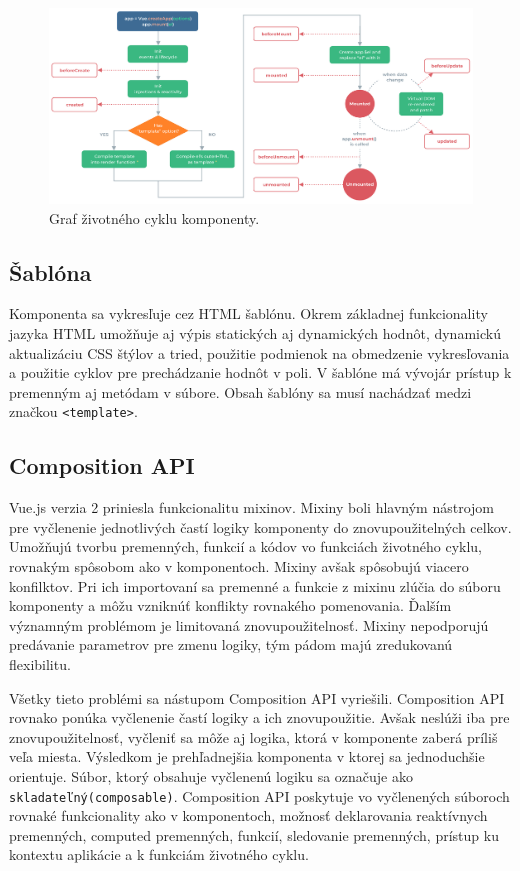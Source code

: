     \begin{figure}[!hbt]
        \centering
        \includegraphics[scale=0.3]{obrazky/lifecycle.png}
        \caption{Graf životného cyklu komponenty\cite{vue-guide}.}
        \label{pic:hooks}
    \end{figure}

\subsection*{Šablóna}
Komponenta sa vykresľuje cez HTML šablónu. Okrem základnej funkcionality jazyka HTML umožňuje aj výpis statických aj dynamických hodnôt, dynamickú aktualizáciu CSS štýlov a tried, použitie podmienok na obmedzenie vykresľovania a použitie cyklov pre prechádzanie hodnôt v poli. V šablóne má vývojár prístup k premenným aj metódam v súbore. Obsah šablóny sa musí nachádzať medzi značkou \texttt{<template>}.

\subsection{Composition API}
\label{compositionapi}
Vue.js verzia 2 priniesla funkcionalitu mixinov. Mixiny boli hlavným nástrojom pre vyčlenenie jednotlivých častí logiky komponenty do znovupoužitelných celkov. Umožňujú tvorbu premenných, funkcií a kódov vo funkciách životného cyklu, rovnakým spôsobom ako v komponentoch. Mixiny avšak spôsobujú viacero konfilktov. Pri ich importovaní sa premenné a funkcie z mixinu zlúčia do súboru komponenty a môžu vzniknúť konflikty rovnakého pomenovania. Ďalším významným problémom je limitovaná znovupoužitelnosť. Mixiny nepodporujú predávanie parametrov pre zmenu logiky, tým pádom majú zredukovanú flexibilitu.

Všetky tieto problémi sa nástupom Composition API vyriešili. Composition API rovnako ponúka vyčlenenie častí logiky a ich znovupoužitie. Avšak neslúži iba pre znovupoužitelnosť, vyčleniť sa môže aj logika, ktorá v komponente zaberá príliš veľa miesta.  Výsledkom je prehľadnejšia komponenta v ktorej sa jednoduchšie orientuje. Súbor, ktorý obsahuje vyčlenenú logiku sa označuje ako \texttt{skladateľný(composable)}. Composition API poskytuje vo vyčlenených súboroch rovnaké funkcionality ako v komponentoch, možnosť deklarovania reaktívnych premenných, computed premenných, funkcií, sledovanie premenných, prístup ku kontextu aplikácie a k funkciám životného cyklu.

